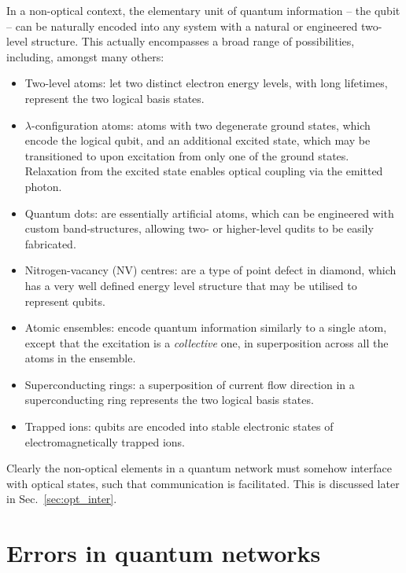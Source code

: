 \documentclass[aps,rmp,twocolumn,amsmath,amssymb,nofootinbib,superscriptaddress,longbibliography,floatfix,table-of-contents,eqsecnum]{revtex4-1}
\begin{document}
In a non-optical context, the elementary unit of quantum information -- the qubit -- can be naturally encoded into any system with a natural or engineered two-level structure. This actually encompasses a broad range of possibilities, including, amongst many others:
\begin{itemize}
\item {}Two-level atoms: let two distinct electron energy levels, with long lifetimes, represent the two logical basis states.
\item {}$\lambda$-configuration atoms: atoms with two degenerate ground states, which encode the logical qubit, and an additional excited state, which may be transitioned to upon excitation from only one of the ground states. Relaxation from the excited state enables optical coupling via the emitted photon.
\item {}Quantum dots: are essentially artificial atoms, which can be engineered with custom band-structures, allowing two- or higher-level qudits to be easily fabricated.
\item {}Nitrogen-vacancy (NV) centres: are a type of point defect in diamond, which has a very well defined energy level structure that may be utilised to represent qubits.
\item {}Atomic ensembles: encode quantum information similarly to a single atom, except that the excitation is a \textit{collective} one, in superposition across all the atoms in the ensemble.
\item {}Superconducting rings: a superposition of current flow direction in a superconducting ring represents the two logical basis states.
\item {}Trapped ions: qubits are encoded into stable electronic states of electromagnetically trapped ions.
\end{itemize}

Clearly the non-optical elements in a quantum network must somehow interface with optical states, such that communication is facilitated. This is discussed later in Sec.~\ref{sec:opt_inter}.

%
%

\section{Errors in quantum networks} \label{sec:errors_in_nets} 
\end{document}
